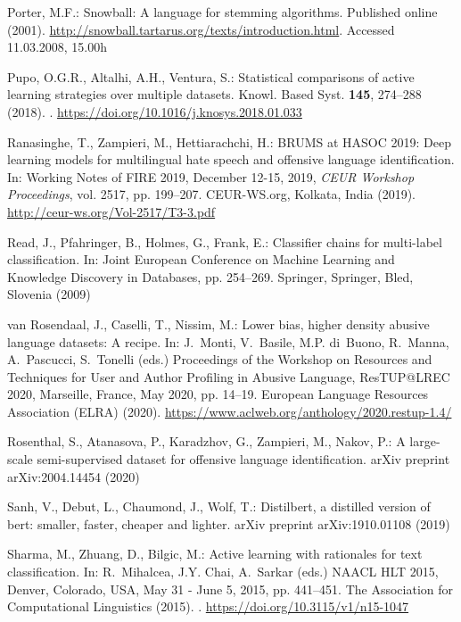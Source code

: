 \documentclass{article}
\begin{document}
\begin{thebibliography}{10}
Porter, M.F.: Snowball: A language for stemming algorithms.
\newblock Published online (2001).
\newblock \urlprefix\url{http://snowball.tartarus.org/texts/introduction.html}.
\newblock Accessed 11.03.2008, 15.00h

Pupo, O.G.R., Altalhi, A.H., Ventura, S.: Statistical comparisons of active
  learning strategies over multiple datasets.
\newblock Knowl. Based Syst. \textbf{145}, 274--288 (2018).
\newblock {}.
\newblock \urlprefix\url{https://doi.org/10.1016/j.knosys.2018.01.033}

Ranasinghe, T., Zampieri, M., Hettiarachchi, H.: {BRUMS} at {HASOC} 2019: Deep
  learning models for multilingual hate speech and offensive language
  identification.
\newblock In: Working Notes of {FIRE} 2019, December 12-15, 2019, \emph{{CEUR}
  Workshop Proceedings}, vol. 2517, pp. 199--207. CEUR-WS.org, Kolkata, India
  (2019).
\newblock \urlprefix\url{http://ceur-ws.org/Vol-2517/T3-3.pdf}

Read, J., Pfahringer, B., Holmes, G., Frank, E.: Classifier chains for
  multi-label classification.
\newblock In: Joint European Conference on Machine Learning and Knowledge
  Discovery in Databases, pp. 254--269. Springer, Springer, Bled, Slovenia
  (2009)

van Rosendaal, J., Caselli, T., Nissim, M.: Lower bias, higher density abusive
  language datasets: {A} recipe.
\newblock In: J.~Monti, V.~Basile, M.P. di~Buono, R.~Manna, A.~Pascucci,
  S.~Tonelli (eds.) Proceedings of the Workshop on Resources and Techniques for
  User and Author Profiling in Abusive Language, ResTUP@LREC 2020, Marseille,
  France, May 2020, pp. 14--19. European Language Resources Association
  {(ELRA)} (2020).
\newblock \urlprefix\url{https://www.aclweb.org/anthology/2020.restup-1.4/}

Rosenthal, S., Atanasova, P., Karadzhov, G., Zampieri, M., Nakov, P.: A
  large-scale semi-supervised dataset for offensive language identification.
\newblock arXiv preprint arXiv:2004.14454  (2020)

Sanh, V., Debut, L., Chaumond, J., Wolf, T.: Distilbert, a distilled version of
  bert: smaller, faster, cheaper and lighter.
\newblock arXiv preprint arXiv:1910.01108  (2019)

Sharma, M., Zhuang, D., Bilgic, M.: Active learning with rationales for text
  classification.
\newblock In: R.~Mihalcea, J.Y. Chai, A.~Sarkar (eds.) {NAACL} {HLT} 2015,
  Denver, Colorado, USA, May 31 - June 5, 2015, pp. 441--451. The Association
  for Computational Linguistics (2015).
\newblock {}.
\newblock \urlprefix\url{https://doi.org/10.3115/v1/n15-1047}


\end{thebibliography}
\end{document}

